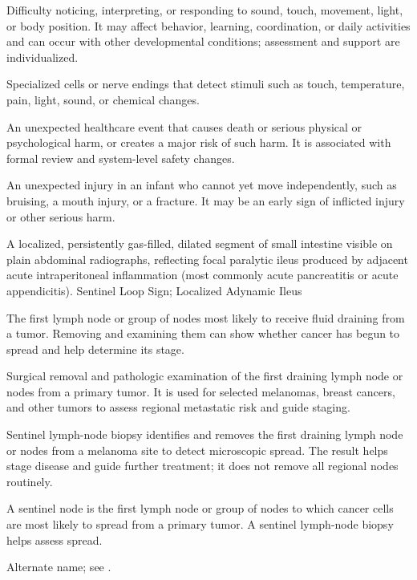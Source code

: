  Difficulty noticing, interpreting, or responding to sound, touch, movement, light, or body position. It may affect behavior, learning, coordination, or daily activities and can occur with other developmental conditions; assessment and support are individualized.

 Specialized cells or nerve endings that detect stimuli such as touch, temperature, pain, light, sound, or chemical changes.

 An unexpected healthcare event that causes death or serious physical or psychological harm, or creates a major risk of such harm. It is associated with formal review and system-level safety changes.

 An unexpected injury in an infant who cannot yet move independently, such as bruising, a mouth injury, or a fracture. It may be an early sign of inflicted injury or other serious harm.

 A localized, persistently gas-filled, dilated segment of small intestine visible on plain abdominal radiographs, reflecting focal paralytic ileus produced by adjacent acute intraperitoneal inflammation (most commonly acute pancreatitis or acute appendicitis).
\synonyms
Sentinel Loop Sign; Localized Adynamic Ileus

 The first lymph node or group of nodes most likely to receive fluid draining from a tumor. Removing and examining them can show whether cancer has begun to spread and help determine its stage.

 Surgical removal and pathologic examination of the first draining lymph node or nodes from a primary tumor. It is used for selected melanomas, breast cancers, and other tumors to assess regional metastatic risk and guide staging.

 Sentinel lymph-node biopsy identifies and removes the first draining lymph node or nodes from a melanoma site to detect microscopic spread. The result helps stage disease and guide further treatment; it does not remove all regional nodes routinely.

 A sentinel node is the first lymph node or group of nodes to which cancer cells are most likely to spread from a primary tumor. A sentinel lymph-node biopsy helps assess spread.

 Alternate name; see .

